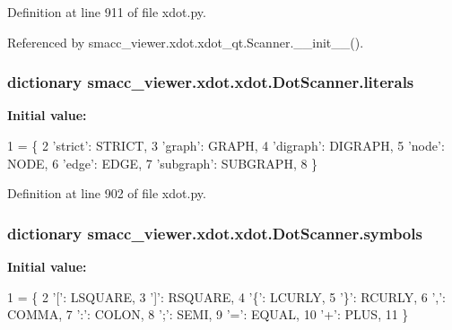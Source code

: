 Definition at line 911 of file xdot.\+py.



Referenced by smacc\+\_\+viewer.\+xdot.\+xdot\+\_\+qt.\+Scanner.\+\_\+\+\_\+init\+\_\+\+\_\+().

\subsubsection[{\texorpdfstring{literals}{literals}}]{\setlength{\rightskip}{0pt plus 5cm}dictionary smacc\+\_\+viewer.\+xdot.\+xdot.\+Dot\+Scanner.\+literals\hspace{0.3cm}{\ttfamily [static]}}\hypertarget{classsmacc__viewer_1_1xdot_1_1xdot_1_1DotScanner_ad0ff606fdffac85a55eb673f273bd9c5}{}\label{classsmacc__viewer_1_1xdot_1_1xdot_1_1DotScanner_ad0ff606fdffac85a55eb673f273bd9c5}
{\bfseries Initial value\+:}
\begin{DoxyCode}
1 = \{
2         \textcolor{stringliteral}{'strict'}: STRICT,
3         \textcolor{stringliteral}{'graph'}: GRAPH,
4         \textcolor{stringliteral}{'digraph'}: DIGRAPH,
5         \textcolor{stringliteral}{'node'}: NODE,
6         \textcolor{stringliteral}{'edge'}: EDGE,
7         \textcolor{stringliteral}{'subgraph'}: SUBGRAPH,
8     \}
\end{DoxyCode}


Definition at line 902 of file xdot.\+py.

\subsubsection[{\texorpdfstring{symbols}{symbols}}]{\setlength{\rightskip}{0pt plus 5cm}dictionary smacc\+\_\+viewer.\+xdot.\+xdot.\+Dot\+Scanner.\+symbols\hspace{0.3cm}{\ttfamily [static]}}\hypertarget{classsmacc__viewer_1_1xdot_1_1xdot_1_1DotScanner_ad69a6379ffb9b09158eb563b3c173897}{}\label{classsmacc__viewer_1_1xdot_1_1xdot_1_1DotScanner_ad69a6379ffb9b09158eb563b3c173897}
{\bfseries Initial value\+:}
\begin{DoxyCode}
1 = \{
2         \textcolor{stringliteral}{'['}: LSQUARE,
3         \textcolor{stringliteral}{']'}: RSQUARE,
4         \textcolor{stringliteral}{'\{'}: LCURLY,
5         \textcolor{stringliteral}{'\}'}: RCURLY,
6         \textcolor{stringliteral}{','}: COMMA,
7         \textcolor{stringliteral}{':'}: COLON,
8         \textcolor{stringliteral}{';'}: SEMI,
9         \textcolor{stringliteral}{'='}: EQUAL,
10         \textcolor{stringliteral}{'+'}: PLUS,
11     \}
\end{DoxyCode}


